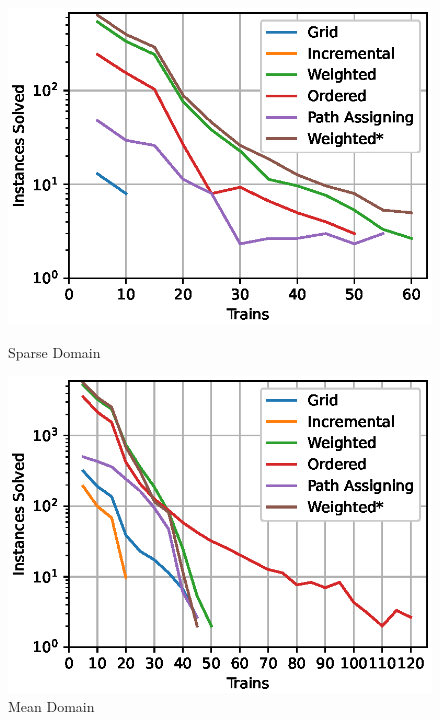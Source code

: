 \documentclass{llncs}
\begin{document}
\begin{multicols*}{2}
\begin{figure}[b]
    \begin{minipage}[t]{0.32\textwidth}
        \includegraphics[width=1\textwidth]{images/sparse_s.eps}
        \caption{Sparse Domain}
        \label{fig:sparse}
    \end{minipage}
    \begin{minipage}[t]{0.32\textwidth}
        \includegraphics[width=1\textwidth]{images/normal_s.eps}
        \caption{Mean Domain}
        \label{fig:middle}
    \end{minipage}
    \begin{minipage}[t]{0.32\textwidth}

\end{minipage}
\end{figure}
\end{multicols*}
\end{document}
